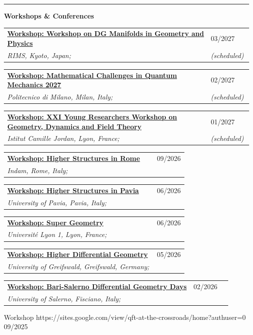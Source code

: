 \documentclass[a4paper]{article}
\newcommand{\block}[1]{\hrule \vspace{0.2cm} \textbf{\Large #1} \vspace{0.2cm}}
\newcommand{\longvoice}[8]{
    \begin{tabular}{p{0.83\linewidth} p{0.17\linewidth} }
        \textbf{\href{#3}{#2: #1}} & #4 
        \\ 
        \textit{#5, #6, #7;} & {\small\emph{#8}}
    \end{tabular}
    \vspace{.5em}
}
\begin{document}


    \block{Workshops \& Conferences}

    
    \longvoice{Workshop on DG Manifolds in Geometry and Physics}
        {Workshop}
        {https://sites.google.com/view/rims2027dgmfd/}
        {03/2027}
        {RIMS}
        {Kyoto}
        {Japan}
        {(scheduled)}
    \longvoice{Mathematical Challenges in Quantum Mechanics 2027}
        {Workshop}
        {https://www.foqus.polimi.it/mcqm27/}
        {02/2027}
        {Politecnico di Milano}
        {Milan}
        {Italy}
        {(scheduled)}
    \longvoice{XXI Young Researchers Workshop on Geometry, Dynamics and Field Theory}
        {Workshop}
        {https://physmath.pages.math.cnrs.fr/events/gdf2026/\#xxi-young-researchers-workshop-on-geometry-dynamics-and-field-theory}
        {01/2027}
        {Istitut Camille Jordan}
        {Lyon}
        {France}
        {(scheduled)}
    \longvoice{Higher Structures in Rome}
        {Workshop}
        {https://www.mat.uniroma2.it/~kowalzig/operads/op.html}
        {09/2026}
        {Indam}
        {Rome}
        {Italy}
        {}
    \longvoice{Higher Structures in Pavia}
        {Workshop}
        {http://wpage.unina.it/francesco.dandrea/Pavia2026/index.html}
        {06/2026}
        {University of Pavia}
        {Pavia}
        {Italy}
        {}
    \longvoice{Super Geometry}
        {Workshop}
        {https://ryvkin.eu/conferences/sg2026/}
        {06/2026}
        {Université Lyon 1}
        {Lyon}
        {France}
        {}
    \longvoice{Higher Differential Geometry}
        {Workshop}
        {https://www.wiko-greifswald.de/en/registrations/higher-differential-geometry}
        {05/2026}
        {University of Greifswald}
        {Greifswald}
        {Germany}
        {}
    \longvoice{Bari-Salerno Differential Geometry Days}
        {Workshop}
        {https://www.dipmat2.unisa.it/people/vitagliano/www/workshop_BA-SA.html}
        {02/2026}
        {University of Salerno}
        {Fisciano}
        {Italy}
        {}
        {Workshop}
        {https://sites.google.com/view/qft-at-the-crossroads/home?authuser=0}
        {09/2025}
\end{document}
